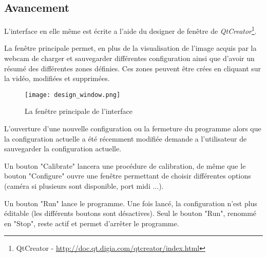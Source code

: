\subsection{Avancement}
\par L'interface en elle même est écrite a l'aide du designer de fenêtre de \emph{QtCreator}\footnote{QtCreator - \url{http://doc.qt.digia.com/qtcreator/index.html}}.
\par La fenêtre principale permet, en plus de la visualisation de l'image acquis par la webcam de charger et sauvegarder différentes configuration ainsi que d'avoir un résumé des différentes zones définies. Ces zones peuvent être crées en cliquant sur la vidéo, modifiées et supprimées.
\begin{figure}
    \centering
    \texttt{[image: design\_window.png]}
    \caption{La fenêtre principale de l'interface}
\end{figure}
\par L'ouverture d'une nouvelle configuration ou la fermeture du programme alors que la configuration actuelle a été récemment modifiée demande a l'utilisateur de sauvegarder la configuration actuelle.
\par Un bouton "Calibrate" lancera une procédure de calibration, de même que le bouton "Configure" ouvre une fenêtre permettant de choisir différentes options (caméra si plusieurs sont disponible, port midi ...).
\par Un bouton "Run" lance le programme. Une fois lancé, la configuration n'est plus éditable (les différents boutons sont désactives). Seul le bouton "Run", renommé en "Stop", reste actif et permet d'arrêter le programme.



